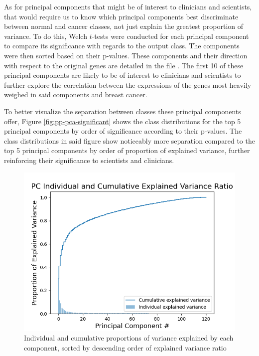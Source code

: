 \documentclass[twocolumn]{article}
\begin{document}
As for principal components that might be of interest to clinicians and scientists, that would require us to know which principal components best discriminate between normal and cancer classes, not just explain the greatest proportion of variance. To do this, Welch $t$-tests were conducted for each principal component to compare its significance with regards to the output class. The components were then sorted based on their p-values. These components and their direction with respect to the original genes are detailed in the file . The first 10 of these principal components are likely to be of interest to clinicians and scientists to further explore the correlation between the expressions of the genes most heavily weighed in said components and breast cancer.

To better visualize the separation between classes these principal components offer, Figure \ref{fig:pp-pca-significant} shows the class distributions for the top 5 principal components by order of significance according to their p-values. The class distributions in said figure show noticeably more separation compared to the top 5 principal components by order of proportion of explained variance, further reinforcing their significance to scientists and clinicians.

\begin{figure}[H]
    \centering
    \includegraphics[width=\linewidth]{figures/PCA_Explained_Variance_Curve.png}
    \caption{Individual and cumulative proportions of variance explained by each component, sorted by descending order of explained variance ratio}
    \label{fig:pc-variance}
\end{figure}
\end{document}
